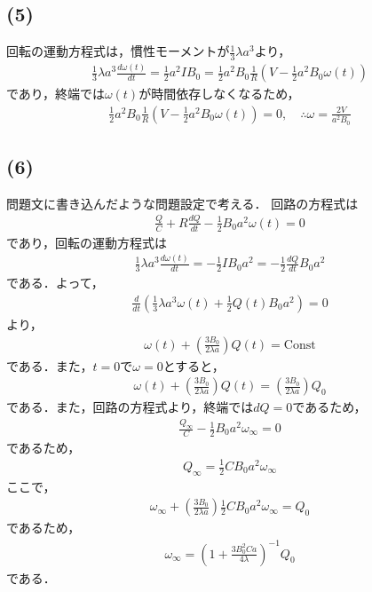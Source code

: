 \documentclass[12pt,dvipdfmx]{jsarticle}
\begin{document}
\subsection*{\large{(5)}}
回転の運動方程式は，慣性モーメントが$\frac{1}{3}\lambda a^3$より，
\begin{eqnarray}
  \frac{1}{3}\lambda a^3\frac{d\omega(t)}{dt} =  \frac{1}{2}a^2 IB_0 =  \frac{1}{2}a^2 B_0\frac{1}{R}\left( V-\frac{1}{2}a^2B_0 \omega(t) \right)
\end{eqnarray}
であり，終端では$\omega(t)$が時間依存しなくなるため，
\begin{eqnarray}
  \frac{1}{2}a^2 B_0\frac{1}{R}\left( V-\frac{1}{2}a^2B_0 \omega(t) \right)=0,\quad\therefore \omega = \frac{2V}{a^2 B_0}
\end{eqnarray}
\subsection*{\large{(6)}}
問題文に書き込んだような問題設定で考える．
回路の方程式は
\begin{eqnarray}
  \frac{Q}{C} + R \frac{dQ}{dt} -\frac{1}{2}B_0a^2 \omega(t) =0
\end{eqnarray}
であり，回転の運動方程式は
\begin{eqnarray}
  \frac{1}{3}\lambda a^3\frac{d\omega(t)}{dt} = -\frac{1}{2}IB_0a^2 = -\frac{1}{2}\frac{dQ}{dt}B_0 a^2
\end{eqnarray}
である．よって，
\begin{eqnarray}
  \frac{d}{dt}\left( \frac{1}{3}\lambda a^3 \omega(t) + \frac{1}{2}Q(t)B_0a^2 \right) =0
\end{eqnarray}
より，
\begin{eqnarray}
  \omega(t) + \left( \frac{3B_0}{2\lambda a} \right)Q(t) =\text{Const}
\end{eqnarray}
である．また，$t=0$で$\omega=0$とすると，
\begin{eqnarray}
  \omega(t) + \left( \frac{3B_0}{2\lambda a} \right)Q(t) =\left( \frac{3B_0}{2\lambda a} \right)Q_0
\end{eqnarray}
である．また，回路の方程式より，終端では$dQ=0$であるため，
\begin{eqnarray}
  \frac{Q_{\infty}}{C} - \frac{1}{2}B_0a^2 \omega_{\infty}=0
\end{eqnarray}
であるため，
\begin{eqnarray}
  Q_{\infty} = \frac{1}{2}CB_0a^2 \omega_{\infty}
\end{eqnarray}
ここで，
\begin{eqnarray}
  \omega_{\infty} +  \left( \frac{3B_0}{2\lambda a} \right)\frac{1}{2}CB_0a^2 \omega_{\infty} = Q_0
\end{eqnarray}
であるため，
\begin{eqnarray}
  \omega_{\infty} = \left( 1 + \frac{3B_0^2 C a}{4\lambda} \right)^{-1}Q_0
\end{eqnarray}
である．
\end{document}
